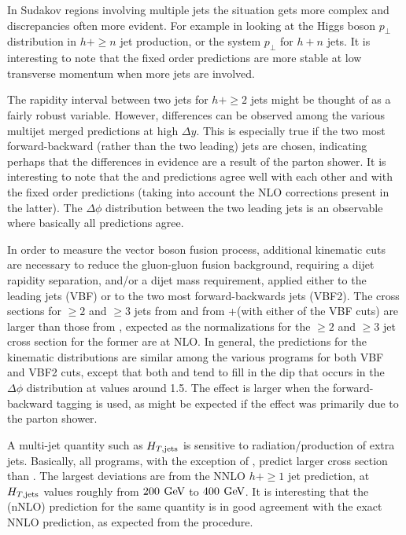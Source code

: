 In Sudakov regions involving multiple jets the situation gets more complex
and discrepancies often more evident. For example in looking at the 
Higgs boson $p_\perp$ distribution in $h+\ge n$ jet production, or the 
system $p_\perp$ for $h+n$ jets. It is interesting to note that the fixed 
order predictions are more stable at low transverse momentum when more 
jets are involved. 

The rapidity interval between two jets for $h+\ge2$ jets might be thought 
of as a fairly robust variable. However, differences can be observed among 
the various multijet merged predictions at high $\Delta y$. This is especially true 
if the two most forward-backward (rather than the two leading) jets are 
chosen, indicating perhaps that the differences in evidence are a result 
of the parton shower. It is interesting to note that the \Powheg \NNLOPS 
and \Sherpa \NNLOPS predictions agree well with each other and with the 
fixed order predictions (taking into account the NLO corrections present 
in the latter). The $\Delta \phi$ distribution between the two leading 
jets is an observable where basically all predictions agree. 

In order to measure the vector boson fusion process, additional kinematic 
cuts are necessary to reduce the gluon-gluon fusion background, requiring 
a dijet rapidity separation, and/or a dijet mass requirement, applied 
either to the leading jets (VBF) or to the two most forward-backwards 
jets (VBF2). The cross sections for $\ge2$ and $\ge3$ jets from \Sherpa 
\MEPSatNLO and from \GoSam{}+\Sherpa (with either of the VBF cuts) are larger than 
those from \Powheg \NNLOPS, expected as the normalizations for the $\ge2$ 
and $\ge3$ jet cross section for the former are at NLO. In general, the 
predictions for the kinematic distributions are similar among the various 
programs for both VBF and VBF2 cuts, except that both \Sherpa \MEPSatNLO and 
\Sherpa \NNLOPS tend to fill in the dip that occurs in the $\Delta \phi$ 
distribution at values around 1.5. The effect is larger when the 
forward-backward tagging is used, as might be expected if the effect was 
primarily due to the parton shower. 

A multi-jet quantity such as $H_{T, {\rm jets}}$ is sensitive to 
radiation/production of extra jets. Basically, all programs, with the 
exception of \Herwig, predict larger cross section than \Powheg \NNLOPS. 
The largest deviations are from the NNLO  $h+\ge1$ jet prediction, at 
$H_{T, {\rm jets}}$ values roughly from $200\,\text{\:GeV}$ to $400\,\text{\:GeV}$. 
It is interesting that the \Loopsim (nNLO) prediction for the same quantity 
is in good agreement with the exact NNLO prediction, as expected from the 
\Loopsim procedure.

